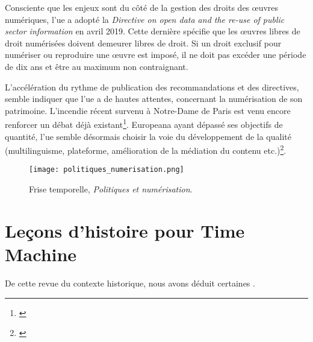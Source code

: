 Consciente que les enjeux sont du côté de la gestion des droits des \oe{}uvres numériques, l'\gls{ue} a adopté la \textit{Directive on open data and the re-use of public sector information} en avril 2019. Cette dernière spécifie que les \oe{}uvres libres de droit numérisées doivent demeurer libres de droit. Si un droit exclusif pour numériser ou reproduire une \oe{}uvre est imposé, il ne doit pas excéder une période de dix ans et être au maximum non contraignant. 

L'accélération du rythme de publication des recommandations et des directives, semble indiquer que l'\gls{ue} a de hautes attentes, concernant la numérisation de son patrimoine. L'incendie récent survenu à Notre-Dame de Paris est venu encore renforcer un débat déjà existant\footnote{\cite{noauthor_european_2019}}. Europeana ayant dépassé ses objectifs de quantité, l'\gls{ue} semble désormais choisir la voie du développement de la qualité (multilinguisme, plateforme, amélioration de la médiation du contenu etc.)\footnote{\cite{noauthor_european_2019}}.

\begin{figure}[H]%
\texttt{[image: politiques\_numerisation.png]}
\caption{Frise temporelle, \textit{Politiques et numérisation}.}
\end{figure}
\newpage

\section{Leçons d'histoire pour Time Machine}

De cette revue du contexte historique, nous avons déduit certaines . %


